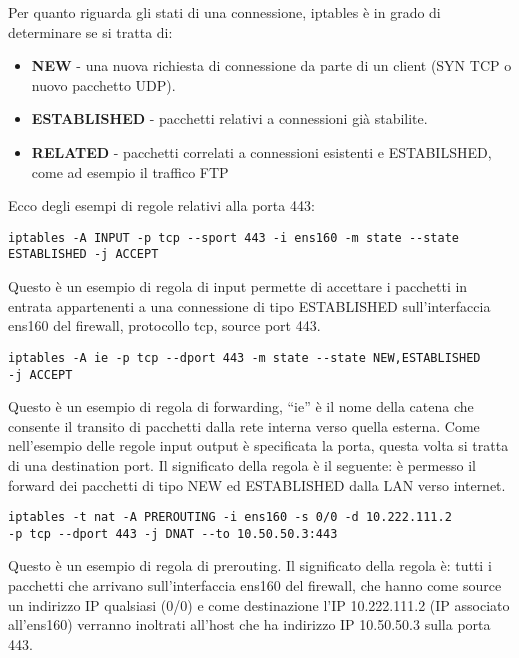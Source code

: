 Per quanto riguarda gli stati di una connessione, iptables è in grado di determinare se si tratta di:

\begin{itemize}
    \item \textbf{NEW} - una nuova richiesta di connessione da parte di un client (SYN TCP o nuovo pacchetto UDP).
    \item \textbf{ESTABLISHED} - pacchetti relativi a connessioni già stabilite.
    \item \textbf{RELATED} - pacchetti correlati a connessioni esistenti e ESTABILSHED, come ad esempio il traffico FTP
\end{itemize}

Ecco degli esempi di regole relativi alla porta 443:

\begin{verbatim}
iptables -A INPUT -p tcp --sport 443 -i ens160 -m state --state
ESTABLISHED -j ACCEPT  
\end{verbatim}

Questo è un esempio di regola di input permette di accettare i pacchetti in entrata appartenenti a una connessione di tipo ESTABLISHED sull'interfaccia ens160 del firewall, protocollo tcp, source port 443.

\begin{verbatim}
iptables -A ie -p tcp --dport 443 -m state --state NEW,ESTABLISHED 
-j ACCEPT
\end{verbatim}

Questo è un esempio di regola di forwarding, ``ie'' è il nome della catena che consente il transito di pacchetti dalla rete interna verso quella esterna. Come nell'esempio delle regole input output è specificata la porta, questa volta si tratta di una destination port. Il significato della regola è il seguente: è permesso il forward dei pacchetti di tipo NEW ed ESTABLISHED dalla LAN verso internet.

\begin{verbatim}
iptables -t nat -A PREROUTING -i ens160 -s 0/0 -d 10.222.111.2 
-p tcp --dport 443 -j DNAT --to 10.50.50.3:443
\end{verbatim}

Questo è un esempio di regola di prerouting. Il significato della regola è: tutti i pacchetti che arrivano sull'interfaccia ens160 del firewall, che hanno come source un indirizzo IP qualsiasi (0/0) e come destinazione l'IP 10.222.111.2 (IP associato all'ens160) verranno inoltrati all'host che ha indirizzo IP 10.50.50.3 sulla porta 443.

